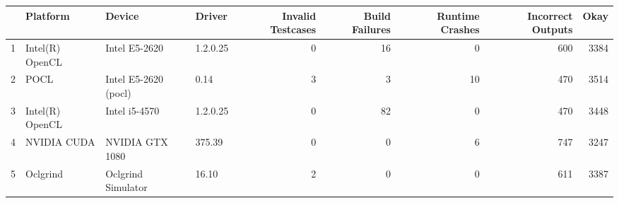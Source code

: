 \begin{tabular}{llllrrrrr}
\toprule
{} &         Platform &                Device &    Driver &  Invalid Testcases &  Build Failures &  Runtime Crashes &  Incorrect Outputs &  Okay \\
\midrule
1 &  Intel(R) OpenCL &         Intel E5-2620 &  1.2.0.25 &                  0 &              16 &                0 &                600 &  3384 \\
2 &             POCL &  Intel E5-2620 (pocl) &      0.14 &                  3 &               3 &               10 &                470 &  3514 \\
3 &  Intel(R) OpenCL &         Intel i5-4570 &  1.2.0.25 &                  0 &              82 &                0 &                470 &  3448 \\
4 &      NVIDIA CUDA &       NVIDIA GTX 1080 &    375.39 &                  0 &               0 &                6 &                747 &  3247 \\
5 &         Oclgrind &    Oclgrind Simulator &     16.10 &                  2 &               0 &                0 &                611 &  3387 \\
\bottomrule
\end{tabular}
